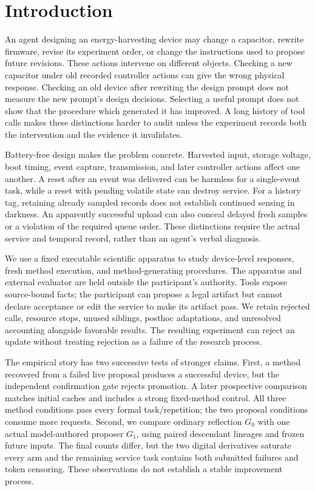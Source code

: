 \section{Introduction}
An agent designing an energy-harvesting device may change a capacitor, rewrite
firmware, revise its experiment order, or change the instructions used to propose
future revisions. These actions intervene on different objects. Checking a new
capacitor under old recorded controller actions can give the wrong physical
response. Checking an old device after rewriting the design prompt does not
measure the new prompt's design decisions. Selecting a useful prompt does not
show that the procedure which generated it has improved. A long history of
tool calls makes these distinctions harder to audit unless the experiment
records both the intervention and the evidence it invalidates.

Battery-free design makes the problem concrete. Harvested input, storage voltage,
boot timing, event capture, transmission, and later controller actions affect one
another. A reset after an event was delivered can be harmless for a single-event
task, while a reset with pending volatile state can destroy service. For a history
tag, retaining already sampled records does not establish continued sensing in
darkness. An apparently successful upload can also conceal delayed fresh samples
or a violation of the required queue order. These distinctions require the
actual service and temporal record, rather than an agent's verbal diagnosis.

We use a fixed executable scientific apparatus to study device-level responses,
fresh method execution, and method-generating procedures. The apparatus and
external evaluator are held outside the participant's authority. Tools expose
source-bound facts; the participant can propose a legal artifact but cannot
declare acceptance or edit the service to make its artifact pass. We retain
rejected calls, resource stops, unused siblings, posthoc adaptations, and
unresolved accounting alongside favorable results. The resulting experiment can
reject an update without treating rejection as a failure of the research process.

The empirical story has two successive tests of stronger claims. First, a method
recovered from a failed live proposal produces a successful device, but the
independent confirmation gate rejects promotion. A later prospective comparison
matches initial caches and includes a strong fixed-method control. All three
method conditions pass every formal task/repetition; the two proposal conditions
consume more requests. Second, we compare ordinary reflection $G_0$ with one
actual model-authored proposer $G_1$, using paired descendant lineages and frozen
future inputs. The final counts differ, but the two digital derivatives saturate
every arm and the remaining service task contains both submitted failures and
token censoring. These observations do not establish a stable improvement process.

